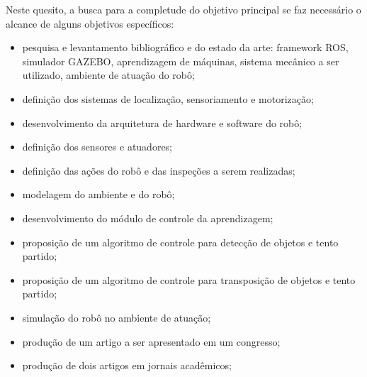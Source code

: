 \noindent Neste quesito, a busca para a completude do objetivo principal se faz necessário o alcance de alguns objetivos específicos:
\begin{itemize}
\item pesquisa e levantamento bibliográfico e do estado da arte: framework ROS, simulador GAZEBO, aprendizagem de máquinas, sistema mecânico a ser utilizado, ambiente de atuação do robô;
\item definição dos sistemas de localização, sensoriamento e motorização;
\item desenvolvimento da arquitetura de hardware e software do robô;
\item definição dos sensores e atuadores;
\item definição das ações do robô e das inspeções a serem realizadas;
\item modelagem do ambiente e do robô;
\item desenvolvimento do módulo de controle da aprendizagem;
\item proposição de um algoritmo de controle para detecção de objetos e tento partido;
\item proposição de um algoritmo de controle para transposição de objetos e tento partido;
\item simulação do robô no ambiente de atuação;
\item produção de um artigo a ser apresentado em um congresso;
\item produção de dois artigos em jornais acadêmicos;
\end{itemize}














